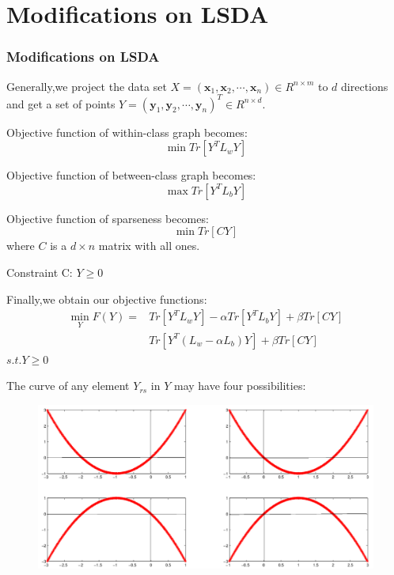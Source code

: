 \documentclass{beamer}
\begin{document}
\section{Modifications on LSDA}
\begin{frame}\frametitle{Modifications on LSDA}
Generally,we project the data set $X=(\textbf{x}_1,\textbf{x}_2,\cdots,\textbf{x}_n)\in R^{n \times m}$ to $d$ directions and get a set of points $Y=(\textbf{y}_1,\textbf{y}_2,\cdots,\textbf{y}_n)^T\in R^{n \times d}$.

Objective function of within-class graph becomes:
\begin{equation}\label{eq:within}
\min Tr[Y^TL_wY]
\end{equation}

Objective function of between-class graph becomes:
\begin{equation}\label{eq:between}
\max Tr[Y^TL_bY]
\end{equation}

Objective function of sparseness becomes:
\begin{equation}\label{eq:sparse}
\min Tr[CY]
\end{equation}
where $C$ is a $d \times n$ matrix with all ones.

Constraint C: $Y \geq 0$
\end{frame}

\begin{frame}
Finally,we obtain our objective functions:
\begin{equation}\label{eq:objective}
\begin{split}
\min_Y F(Y)=&Tr[Y^TL_wY]-\alpha Tr[Y^TL_bY]+\beta Tr[CY]\\
&Tr[Y^T(L_w-\alpha L_b)Y]+\beta Tr[CY]
\end{split}
\end{equation}
\;\;\;$s.t. Y\geq 0$
\end{frame}

\begin{frame}
The curve of any element $Y_{rs}$ in $Y$ may have four possibilities:
\begin{figure}
\includegraphics[scale=0.3]{images/plot}
\end{figure}
\end{frame}
\end{document}
